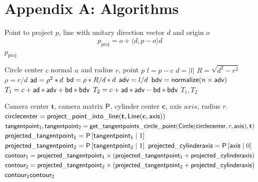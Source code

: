 \section{Appendix A: Algorithms}

\begin{algorithm}[H]
\caption{Project Point Onto Line}
\label{alg:project_point_onto_line}
\begin{algorithmic}[1]
\REQUIRE Point to project $p$, line with unitary direction vector $d$ and origin $o$
\STATE
\[ p_{\text{proj}} = o + \langle d, p - o\rangle d \]
\RETURN $p_{\text{proj}}$
\end{algorithmic}
\end{algorithm}

%
%
\begin{algorithm}[H]
\caption{Calculate tangent points on a circle from a reference point $p$}
\label{alg:tangent_points_circle_point}
\begin{algorithmic}[1]
\REQUIRE Circle center $c$ normal $n$ and radius $r$, point $p$
\STATE $l = p - c$
\STATE $d = |l|$
\STATE $R = \sqrt{d^2 - r^2}$
\STATE $\rho = r/d$
\STATE $\mathsf{ad} = \rho^2 * d$
\STATE $\mathsf{bd} = \rho * R / d * d$
\STATE $\mathsf{adv} = l / d$
\STATE $\mathsf{bdv} = \mathsf{normalize}(n \times \mathsf{adv})$
\STATE $T_1 = c + \mathsf{ad} * \mathsf{adv} + \mathsf{bd} * \mathsf{bdv}$
\STATE $T_2 = c + \mathsf{ad} * \mathsf{adv} - \mathsf{bd} * \mathsf{bdv}$
\RETURN $T_1, T_2$
\end{algorithmic}
\end{algorithm}

\begin{algorithm} [H]
  \caption{Find lines in homogeneous coordinates from a cylinder and a camera}
  \label{alg:get_cylinder_contours}
\begin{algorithmic}[1]
\REQUIRE Camera center $\mathbf{t}$, camera matrix $\mathsf{P}$, cylinder center $\mathbf{c}$, axis $axis$, radius $r$. 
\STATE $\mathsf{circlecenter} = \mathsf{project\_point\_into\_line}(\mathbf{t}, \mathsf{Line}(\mathbf{c}, \mathsf{axis}))$
\STATE $\mathsf{tangentpoint_1}, \mathsf{tangentpoint_2} = \mathsf{get\_tangentpoints\_circle\_point}(
	\mathsf{Circle}(\mathsf{circlecenter}, r, \mathsf{axis}),
	\mathbf{t}
)$
\STATE $\mathsf{projected\_tangentpoint_1} = \mathsf{P} \left[\mathsf{tangentpoint_1} \;| \; 1\right]$
\STATE $\mathsf{projected\_tangentpoint_2} = \mathsf{P} \left[\mathsf{tangentpoint_2} \;| \; 1\right]$
\STATE $\mathsf{projected\_cylinderaxis} = \mathsf{P} \left[\mathsf{axis} \;| \; 0\right]$
\STATE $\mathsf{contour_1} = \mathsf{projected\_tangentpoint_1} \times ( \mathsf{projected\_tangentpoint_1} + \mathsf{projected\_cylinderaxis})$
\STATE $\mathsf{contour_2} = \mathsf{projected\_tangentpoint_2} \times ( \mathsf{projected\_tangentpoint_2} + \mathsf{projected\_cylinderaxis})$
\RETURN $\mathsf{contour_1} \mathsf{contour_2}$
\end{algorithmic}
\end{algorithm}


